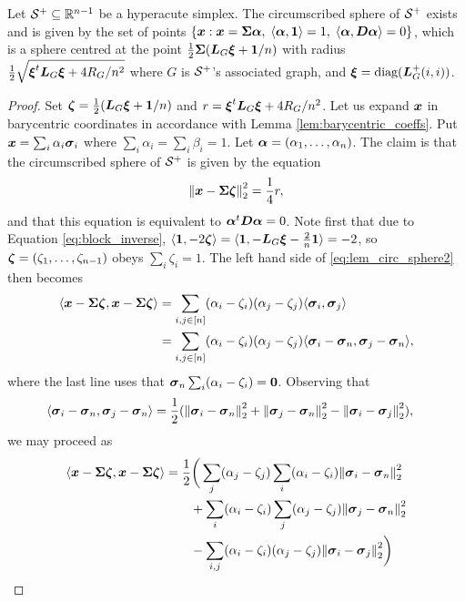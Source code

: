 \begin{lemma}
	\label{lem:circ_sphere}
	Let $\mathcal{S}^+\subseteq\mathbb{R}^{n-1}$ be a hyperacute simplex. The circumscribed sphere  of $\mathcal{S}^+$ exists and is given by the set of points $\{\vb*{x}:\vb*{x}=\boldsymbol{\Sigma}\vb*{\alpha}, \; \langle \vb*{\alpha},\vb{1} \rangle = 1, \; \langle \vb*{\alpha},\vb*{D}\vb*{\alpha}\rangle =0\}$, which is a sphere centred at the point $\frac{1}{2}\boldsymbol{\Sigma}(\vb*{L}_G\vb*{\xi} + \vb{1}/n)$ with radius $\frac{1}{2}\sqrt{\vb*{\xi}^t\vb*{L}_G\vb*{\xi} + 4R_G/n^2}$ where $G$ is $\mathcal{S}^+$'s associated graph, and $\vb*{\xi} = \text{diag}(\vb*{L}_G^+(i,i))$. 
\end{lemma}
\begin{proof}
Set $\vb*{\zeta} = \frac{1}{2}(\vb*{L}_G\vb*{\xi} + \vb{1}/n)$ and $r = \vb*{\xi}^t \vb*{L}_G\vb*{\xi}+4R_G/n^2$. 
Let us expand $\vb*{x}$ in barycentric coordinates in accordance with Lemma \ref{lem:barycentric_coeffs}.  Put $\vb*{x}=\sum_i \alpha_i\vb*{\sigma}_i$ where $\sum_i\alpha_i=\sum_i\beta_i=1$. Let $\vb*{\alpha}=(\alpha_1,\dots,\alpha_n)$. 
The claim is that the circumscribed sphere of $\mathcal{S}^+$ is given by the equation 
\begin{equation}
\label{eq:lem_circ_sphere2}
\norm{\vb*{x} - \boldsymbol{\Sigma}\vb*{\zeta}}_2^2 = \frac{1}{4}r,
\end{equation}
and that this equation is equivalent to $\vb*{\alpha}^t \vb*{D}\vb*{\alpha}=0$. Note first that due to Equation \ref{eq:block_inverse}, $\langle \vb{1}, -2\vb*{\zeta}\rangle = \langle \vb{1}, -\vb*{L}_G\vb*{\xi} - \frac{2}{n}\vb{1}\rangle = -2$, so $\vb*{\zeta}=(\zeta_1,\dots,\zeta_{n-1})$ obeys $\sum_i \zeta_i=1$.  The left hand side of \eqref{eq:lem_circ_sphere2} then becomes 
\begin{align*}
\langle \vb*{x}-\boldsymbol{\Sigma}\vb*{\zeta},\vb*{x}-\boldsymbol{\Sigma}\vb*{\zeta}\rangle &= \sum_{i,j\in[n]} (\alpha_i-\zeta_i)(\alpha_j-\zeta_j) \langle \vb*{\sigma}_i,\vb*{\sigma}_j\rangle \\
&= \sum_{i,j\in[n]} (\alpha_i-\zeta_i)(\alpha_j-\zeta_j) \langle \vb*{\sigma}_i-\vb*{\sigma}_n,\vb*{\sigma}_j-\vb*{\sigma}_n\rangle,
\end{align*} 
where the last line uses that $\vb*{\sigma}_n \sum_i(\alpha_i-\zeta_i)=\vb{0}$. 
Observing that 
\begin{align*}
\langle \vb*{\sigma}_i-\vb*{\sigma}_n,\vb*{\sigma}_j-\vb*{\sigma}_n\rangle &= \frac{1}{2}(\norm{\vb*{\sigma}_i-\vb*{\sigma}_n}_2^2 + \norm{\vb*{\sigma}_j-\vb*{\sigma}_n}_2^2 - \norm{\vb*{\sigma}_i-\vb*{\sigma}_j}_2^2),
\end{align*}
we may proceed as
\begin{align}
\la\x-\Sv\bzeta,\x-\Sv\bzeta\ra &= \frac{1}{2}\bigg(\sum_j (\alpha_j-\zeta_j) \sum_i (\alpha_i-\zeta_i)\norm{\sv_i-\sv_n}_2^2 \notag \\
&\qquad + \sum_i (\alpha_i-\zeta_i) \sum_j (\alpha_j-\zeta_j)\norm{\sv_j-\sv_n}_2^2  \notag \\
&\qquad - \sum_{i,j} (\alpha_i-\zeta_i)(\alpha_j-\zeta_j)\norm{\sv_i-\sv_j}_2^2 \bigg)\notag \\

\end{align}
\end{proof}
